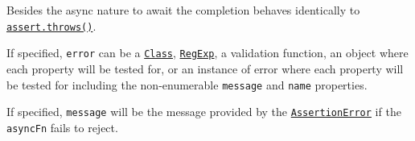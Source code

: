 Besides the async nature to await the completion behaves identically to
\hyperref[assertthrowsfn-error-message]{\texttt{assert.throws()}}.

If specified, \texttt{error} can be a
\href{https://developer.mozilla.org/en-US/docs/Web/JavaScript/Reference/Classes}{\texttt{Class}},
\href{https://developer.mozilla.org/en-US/docs/Web/JavaScript/Guide/Regular_Expressions}{\texttt{RegExp}},
a validation function, an object where each property will be tested for,
or an instance of error where each property will be tested for including
the non-enumerable \texttt{message} and \texttt{name} properties.

If specified, \texttt{message} will be the message provided by the
\hyperref[class-assertassertionerror]{\texttt{AssertionError}} if the
\texttt{asyncFn} fails to reject.

\begin{Shaded}
\begin{Highlighting}[]
 \OperatorTok{;}

\NormalTok{(}
  \NormalTok{ () }\KeywordTok{=\textgreater{}}\NormalTok{ \{}
      \NormalTok{(}\NormalTok{)}\OperatorTok{;}
\NormalTok{  \}}\OperatorTok{,}
\NormalTok{  \{}
    \OperatorTok{:} \OperatorTok{,}
    \OperatorTok{:} \OperatorTok{,}
\NormalTok{  \}}\OperatorTok{,}
\NormalTok{)}\OperatorTok{;}
\end{Highlighting}
\end{Shaded}

\begin{Shaded}
\begin{Highlighting}[]
\OperatorTok{=} \NormalTok{(}\NormalTok{)}\OperatorTok{;}

\NormalTok{(}\NormalTok{ () }\KeywordTok{=\textgreater{}}\NormalTok{ \{}
  \NormalTok{(}
    \NormalTok{ () }\KeywordTok{=\textgreater{}}\NormalTok{ \{}
        \NormalTok{(}\NormalTok{)}\OperatorTok{;}
\NormalTok{    \}}\OperatorTok{,}
\NormalTok{    \{}
      \OperatorTok{:} \OperatorTok{,}
      \OperatorTok{:} \OperatorTok{,}
\NormalTok{    \}}\OperatorTok{,}
\NormalTok{  )}\OperatorTok{;}
\NormalTok{\})()}\OperatorTok{;}
\end{Highlighting}
\end{Shaded}

